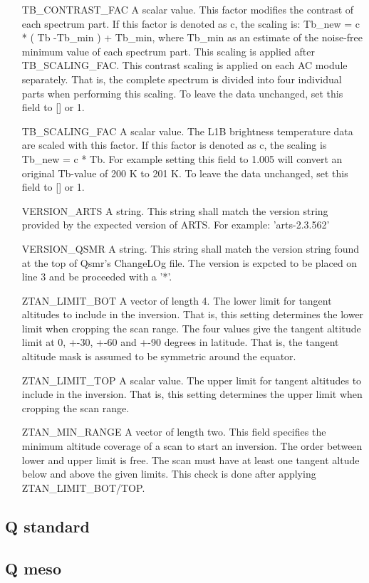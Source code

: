 \begin{changemargin}{2.5cm}{0.0cm}
\begin{itemize}
\item[{TB\_CONTRAST\_FAC}] 
A scalar value. This factor modifies the contrast of each spectrum part.
If this factor is denoted as c, the scaling is:
Tb\_new = c * ( Tb -Tb\_min ) + Tb\_min,
where Tb\_min as an estimate of the noise-free minimum value of each
spectrum part. This scaling is applied after TB\_SCALING\_FAC. This contrast
scaling is applied on each AC module separately. That is, the complete
spectrum is divided into four individual parts when performing this scaling.
To leave the data unchanged, set this field to {[}{]} or 1.

\item[{TB\_SCALING\_FAC}] 
A scalar value. The L1B brightness temperature data are scaled with this
factor. If this factor is denoted as c, the scaling is Tb\_new = c * Tb.
For example setting this field to 1.005 will convert an original  Tb-value
of 200 K to 201 K. To leave the data unchanged, set this field to {[}{]} or 1.

\item[{VERSION\_ARTS}] 
A string. This string shall match the version string provided by the
expected version of ARTS. For example: 'arts-2.3.562'

\item[{VERSION\_QSMR}] 
A string. This string shall match the version string found at the top of
Qsmr's ChangeLOg file. The version is expcted to be placed on line 3 and be
proceeded with a '*'.

\item[{ZTAN\_LIMIT\_BOT}] 
A vector of length 4. The lower limit for tangent altitudes to include in
the inversion. That is, this setting determines the lower limit when
cropping the scan range. The four values give the tangent altitude limit at
0, +-30, +-60 and +-90 degrees in latitude. That is, the tangent altitude
mask is assumed to be symmetric around the equator.

\item[{ZTAN\_LIMIT\_TOP}] 
A scalar value. The upper limit for tangent altitudes to include in the
inversion. That is, this setting determines the upper limit when cropping
the scan range.

\item[{ZTAN\_MIN\_RANGE}] 
A vector of length two. This field specifies the minimum altitude coverage of a
scan to start an inversion. The order between lower and upper limit is free.
The scan must have at least one tangent altude below and above the given
limits. This check is done after applying ZTAN\_LIMIT\_BOT/TOP.

\end{itemize}

\end{changemargin}

\clearpage
\newpage
\subsection{Q standard}
\label{sec:standard}
\clearpage
\newpage

\subsection{Q meso}
\label{sec:meso}

